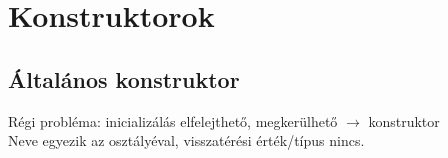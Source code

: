 \documentclass[usenames,dvipsnames,aspectratio=169]{beamer}
\begin{document}
\begin{frame}
    \begin{exampleblock}{}
        \footnotesize
        
    \end{exampleblock}
\end{frame}

\begin{frame}
    \begin{exampleblock}{}
        
    \end{exampleblock}
\end{frame}

\begin{frame}
    \begin{exampleblock}{}
        \small
        
    \end{exampleblock}
\end{frame}

\begin{frame}
    \begin{exampleblock}{}
        \small
        
    \end{exampleblock}
\end{frame}

\section{Konstruktorok}

\subsection{Általános konstruktor}

\begin{frame}
    Régi probléma: inicializálás elfelejthető, megkerülhető $\to$ konstruktor\\
    Neve egyezik az osztályéval, visszatérési érték/típus nincs.
    \begin{exampleblock}{}
        \scriptsize
        
    \end{exampleblock}
    \begin{exampleblock}{}
        \scriptsize
        
    \end{exampleblock}
\end{frame}
\end{document}
